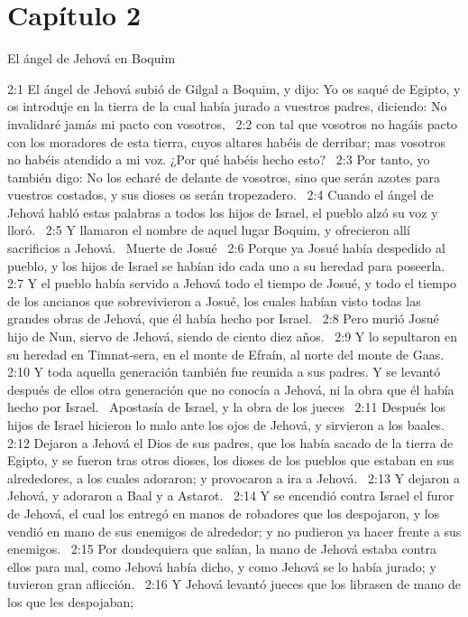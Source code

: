 \section*{Capítulo 2}
El ángel de Jehová en Boquim  

2:1 El ángel de Jehová subió de Gilgal a Boquim, y dijo: Yo os saqué de Egipto, y os introduje en la tierra de la cual había jurado a vuestros padres, diciendo: No invalidaré jamás mi pacto con vosotros,  
2:2 con tal que vosotros no hagáis pacto con los moradores de esta tierra, cuyos altares habéis de derribar; mas vosotros no habéis atendido a mi voz. ¿Por qué habéis hecho esto?  
2:3 Por tanto, yo también digo: No los echaré de delante de vosotros, sino que serán azotes para vuestros costados, y sus dioses os serán tropezadero.  
2:4 Cuando el ángel de Jehová habló estas palabras a todos los hijos de Israel, el pueblo alzó su voz y lloró.  
2:5 Y llamaron el nombre de aquel lugar Boquim, y ofrecieron allí sacrificios a Jehová.  
Muerte de Josué   
2:6 Porque ya Josué había despedido al pueblo, y los hijos de Israel se habían ido cada uno a su heredad para poseerla.  
2:7 Y el pueblo había servido a Jehová todo el tiempo de Josué, y todo el tiempo de los ancianos que sobrevivieron a Josué, los cuales habían visto todas las grandes obras de Jehová, que él había hecho por Israel.  
2:8 Pero murió Josué hijo de Nun, siervo de Jehová, siendo de ciento diez años.  
2:9 Y lo sepultaron en su heredad en Timnat-sera, en el monte de Efraín, al norte del monte de Gaas.  
2:10 Y toda aquella generación también fue reunida a sus padres. Y se levantó después de ellos otra generación que no conocía a Jehová, ni la obra que él había hecho por Israel.  
Apostasía de Israel, y la obra de los jueces  
2:11 Después los hijos de Israel hicieron lo malo ante los ojos de Jehová, y sirvieron a los baales.  
2:12 Dejaron a Jehová el Dios de sus padres, que los había sacado de la tierra de Egipto, y se fueron tras otros dioses, los dioses de los pueblos que estaban en sus alrededores, a los cuales adoraron; y provocaron a ira a Jehová.  
2:13 Y dejaron a Jehová, y adoraron a Baal y a Astarot.  
2:14 Y se encendió contra Israel el furor de Jehová, el cual los entregó en manos de robadores que los despojaron, y los vendió en mano de sus enemigos de alrededor; y no pudieron ya hacer frente a sus enemigos.  
2:15 Por dondequiera que salían, la mano de Jehová estaba contra ellos para mal, como Jehová había dicho, y como Jehová se lo había jurado; y tuvieron gran aflicción.  
2:16 Y Jehová levantó jueces que los librasen de mano de los que les despojaban;  
